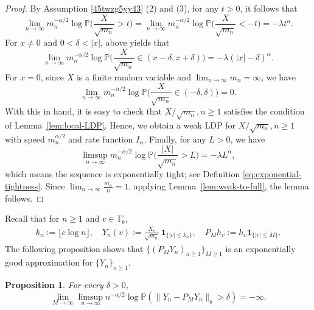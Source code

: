 \documentclass[a4paper, 11pt]{article}
\newcommand{\1}{\mathbf 1}
\theoremstyle{plain}
\newtheorem{proposition}[theorem]{Proposition}
\begin{document}
\begin{proof}
By Assumption \ref{45twzg5yy43} (2) and (3), for any \(t>0\), it follows that
\[
  \lim_{n\to\infty}m_n^{-\alpha/2}
  \log\mathbb{P}\!\Big(\frac{X}{\sqrt{m_n}}>t\Big)
  =
  \lim_{n\to\infty}m_n^{-\alpha/2}
  \log\mathbb{P}\!\Big(\frac{X}{\sqrt{m_n}}<-t\Big)
  =-\lambda t^\alpha .
\]
For \(x\neq0\) and \(0<\delta<|x|\), above yields that
\[
  \lim_{n\to\infty}m_n^{-\alpha/2}
  \log\mathbb{P}\!\Big(
    \frac{X}{\sqrt{m_n}}\in(x-\delta,x+\delta)
  \Big)
  =-\lambda(|x|-\delta)^\alpha .
\]
For $x=0$, since $X$ is a finite random variable and $\lim_{n\to\infty}m_n=\infty$, we have
\[
  \lim_{n\to\infty}m_n^{-\alpha/2}
  \log\mathbb{P}\!\Big(
    \frac{X}{\sqrt{m_n}}\in(-\delta,\delta)
  \Big)
  =0 .
\]
With this in hand, it is easy to check that \(X/\sqrt{m_n}, n\geq1\) satisfies the condition of Lemma~\ref{lem:local-LDP}. Hence, we obtain a weak LDP for \(X/\sqrt{m_n}, n\geq1\) with speed $m_n^{\alpha/2}$ and rate function $I_{\alpha}$. Finally, for any $L>0$, we have
\[
  \limsup_{n\to\infty}m_n^{-\alpha/2}
  \log\mathbb{P}\!\Big(\frac{|X|}{\sqrt{m_n}}>L\Big)
  =-\lambda L^\alpha ,
\]
which means the sequence is exponentially tight; see Definition \ref{eq:exponential-tightness}. Since $\lim_{n\to\infty}\frac{m_n}{n}=1$, applying Lemma~\ref{lem:weak-to-full}, the lemma follows.
\end{proof}




Recall that for $n\geq1$ and $v\in\mathbb{T}_b^\circ$,
\begin{align}\label{45t46yy5t}
k_n:=\lfloor c\log n\rfloor,\quad
  Y_n(v):=
  \frac{X_v}{\sqrt{m_n}}\,
  \mathbf{1}_{\{|v|\leq k_n\}},\quad
  P_Mh_v:=h_v\mathbf{1}_{\{|v|\leq M\}}.
\end{align}
The following proposition shows that $\{(P_MY_n)_{n\geq1}\}_{M\geq1}$ is an exponentially good approximation for $\{Y_n\}_{n\geq1}$.
\begin{proposition}
\label{prop:exp-approx}
For every \(\delta>0\),
\begin{equation}\label{eq:exp-approx}
  \lim_{M\to\infty}\limsup_{n\to\infty}
  n^{-\alpha/2}
  \log\mathbb{P}\!\left(\|Y_n-P_MY_n\|_b>\delta\right)
  =-\infty.
\end{equation}
\end{proposition}
\end{document}
